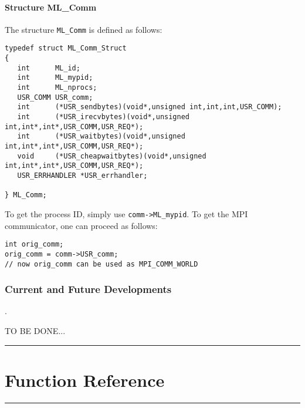 \documentclass[10pt,letter,relax]{SANDreport}
\newcommand{\HRule}{\noindent\rule{\linewidth}{1mm}}
\begin{document}
\subsection{Structure ML\_Comm}

The structure \verb!ML_Comm! is defined as follows:
\begin{verbatim}
typedef struct ML_Comm_Struct
{
   int      ML_id;
   int      ML_mypid;
   int      ML_nprocs;
   USR_COMM USR_comm;
   int      (*USR_sendbytes)(void*,unsigned int,int,int,USR_COMM);
   int      (*USR_irecvbytes)(void*,unsigned int,int*,int*,USR_COMM,USR_REQ*);
   int      (*USR_waitbytes)(void*,unsigned int,int*,int*,USR_COMM,USR_REQ*);
   void     (*USR_cheapwaitbytes)(void*,unsigned int,int*,int*,USR_COMM,USR_REQ*);
   USR_ERRHANDLER *USR_errhandler;

} ML_Comm;
\end{verbatim}
To get the process ID, simply use \verb!comm->ML_mypid!. To get the MPI
communicator, one can proceed as follows:
\begin{verbatim}
int orig_comm;
orig_comm = comm->USR_comm;
// now orig_comm can be used as MPI_COMM_WORLD
\end{verbatim}


\section{Current and Future Developments}
\label{sec:to-do}.

TO BE DONE...


\clearpage
\newpage

\vspace*{3cm}
\HRule
\part{Function Reference}
\HRule
\clearpage
\newpage




\end{document}
